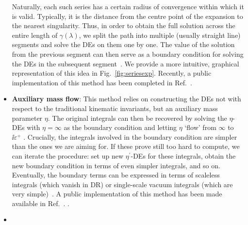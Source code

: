 \documentclass[main.tex]{subfiles}
\begin{document}
\begin{itemize}
    Naturally, each such series has a certain radius of convergence within which it is valid. Typically, it is the distance from the centre point of the expansion to the nearest singularity. Thus, in order to obtain the full solution across the entire length of $\gamma(\lambda)$, we split the path into multiple (usually straight line) segments and solve the DEs on them one by one. The value of the solution from the previous segment can then serve as a boundary condition for solving the DEs in the subsequent segment~\cite{Moriello:2019yhu, Bonciani:2019jyb, Frellesvig:2019byn}. We provide a more intuitive, graphical representation of this idea in Fig.~\ref{fig:seriesexp}. Recently, a public implementation of this method has been completed in Ref.~\cite{Hidding:2020ytt}.
    \item \textbf{Auxiliary mass flow}: This method relies on constructing the DEs not with respect to the traditional kinematic invariants, but an auxiliary mass parameter $\eta$. The original integrals can then be recovered by solving the $\eta$-DEs with $\eta = \infty$ as the boundary condition and letting $\eta$ `flow' from $\infty$ to $\ii \varepsilon^+$ . Crucially, the integrals involved in the boundary condition are simpler than the ones we are aiming for. If these prove still too hard to compute, we can iterate the procedure: set up new $\eta^\prime$-DEs for these integrals, obtain the new boundary condition in terms of even simpler integrals, and so on. Eventually, the boundary terms can be expressed in terms of scaleless integrals (which vanish in DR) or single-scale vacuum integrals (which are very simple)~\cite{Liu:2017jxz, Liu:2021wks}. A public implementation of this method has been made available in Ref.~\cite{Liu:2022chg}. .
    \item {}
\end{itemize}
\end{document}
